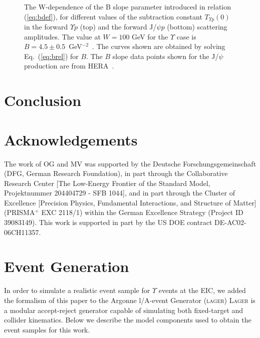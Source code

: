 \documentclass[10pt,prd,aps,nofootinbib,superscriptaddress]{revtex4}
\begin{document}
\begin{figure}
\caption{
The W-dependence of the B slope parameter introduced in relation (\ref{eq:bdef}),
for different values of the subtraction constant $T_{\Upsilon p} (0)$ in the forward $\Upsilon p$ (top) and the forward J/$\psi p $ (bottom) scattering amplitudes.
The value at $W=100$ GeV for the $\Upsilon$ case is $B=4.5\pm0.5$~GeV$^{-2}$~\cite{Chekanov:2009zz}.
The curves shown are obtained by solving Eq.~(\ref{eq:brel}) for $B$.
The $B$ slope data points shown for the J/$\psi$ production are from HERA~\cite{Chekanov:2002xi}.
}
\label{fig:bslope}
\end{figure}

\section{Conclusion}

\section*{Acknowledgements}
The work of OG and MV was supported by the Deutsche Forschungsgemeinschaft (DFG, German Research Foundation),
in part through the Collaborative Research Center [The Low-Energy Frontier of the Standard
Model, Projektnummer 204404729 - SFB 1044], and in part through the Cluster of Excellence
[Precision Physics, Fundamental Interactions, and Structure of Matter] (PRISMA$^+$ EXC
2118/1) within the German Excellence Strategy (Project ID 39083149).
This work is supported in part by the US DOE contract DE-AC02-06CH11357.


\appendix
\section{Event Generation\label{apx-evgen}}
In order to simulate a realistic event sample for $\Upsilon$ events at the EIC,
we added the formalism of this paper to the Argonne l/A-event Generator (\textsc{lager}) \cite{git:lager}
\textsc{Lager} is a modular accept-reject generator capable of simulating both fixed-target and collider kinematics. Below we describe the model components used to obtain the event samples for this work.
\end{document}
